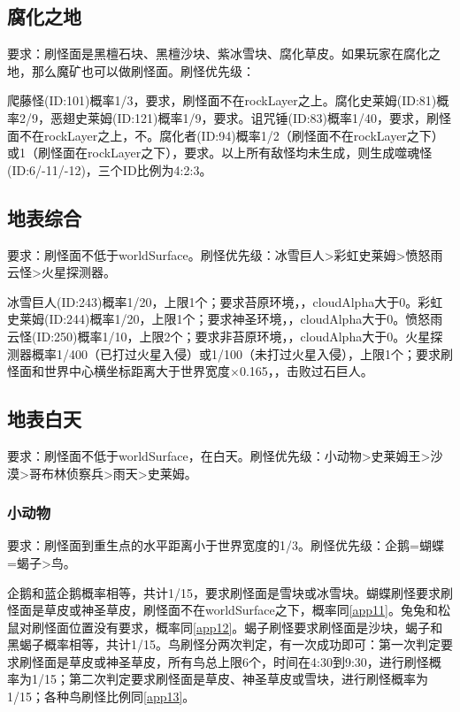 \subsection{腐化之地}
要求：刷怪面是黑檀石块、黑檀沙块、紫冰雪块、腐化草皮。如果玩家在腐化之地，那么魔矿也可以做刷怪面。刷怪优先级：

爬藤怪(ID:101)概率1/3，要求，刷怪面不在rockLayer之上。腐化史莱姆(ID:81)概率2/9，恶翅史莱姆(ID:121)概率1/9，要求。诅咒锤(ID:83)概率1/40，要求，刷怪面不在rockLayer之上，不。腐化者(ID:94)概率1/2（刷怪面不在rockLayer之下）或1（刷怪面在rockLayer之下），要求。以上所有敌怪均未生成，则生成噬魂怪(ID:6/-11/-12)，三个ID比例为4:2:3。

\subsection{地表综合}\label{app32}
要求：刷怪面不低于worldSurface。刷怪优先级：冰雪巨人>彩虹史莱姆>愤怒雨云怪>火星探测器。

冰雪巨人(ID:243)概率1/20，上限1个；要求苔原环境，，cloudAlpha大于0。彩虹史莱姆(ID:244)概率1/20，上限1个；要求神圣环境，，cloudAlpha大于0。愤怒雨云怪(ID:250)概率1/10，上限2个；要求非苔原环境，，cloudAlpha大于0。火星探测器概率1/400（已打过火星入侵）或1/100（未打过火星入侵），上限1个；要求刷怪面和世界中心横坐标距离大于世界宽度$\times$0.165，，击败过石巨人。

\subsection{地表白天}
要求：刷怪面不低于worldSurface，在白天。刷怪优先级：小动物>史莱姆王>沙漠>哥布林侦察兵>雨天>史莱姆。

\subsubsection{小动物}
要求：刷怪面到重生点的水平距离小于世界宽度的1/3。刷怪优先级：企鹅=蝴蝶=蝎子>鸟。

企鹅和蓝企鹅概率相等，共计1/15，要求刷怪面是雪块或冰雪块。蝴蝶刷怪要求刷怪面是草皮或神圣草皮，刷怪面不在worldSurface之下，概率同\autoref{app11}。兔兔和松鼠对刷怪面位置没有要求，概率同\autoref{app12}。蝎子刷怪要求刷怪面是沙块，蝎子和黑蝎子概率相等，共计1/15。鸟刷怪分两次判定，有一次成功即可：第一次判定要求刷怪面是草皮或神圣草皮，所有鸟总上限6个，时间在4:30到9:30，进行刷怪概率为1/15；第二次判定要求刷怪面是草皮、神圣草皮或雪块，进行刷怪概率为1/15；各种鸟刷怪比例同\autoref{app13}。

